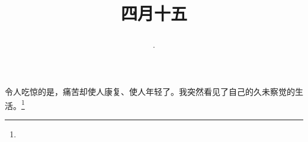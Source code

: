 \title{\date[d=22,m=5,y=2024][year:cn-y,年,month:cn,day:cn,日,·,weekday]·四月十五 }
令人吃惊的是，痛苦却使人康复、使人年轻了。我突然看见了自己的久未察觉的生活。\footnote{ }

